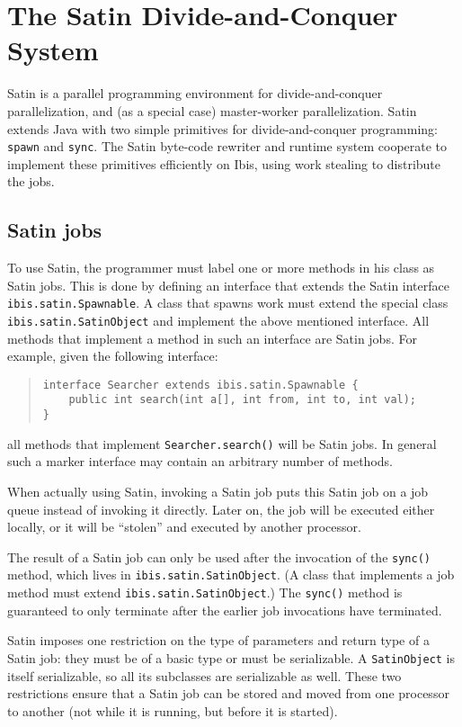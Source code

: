 \documentclass[10pt]{article}
\newcommand{\mysection}[1]{\section{#1}\label{#1}}
\newcommand{\mysubsection}[1]{\subsection{#1}\label{#1}}
\begin{document}
\mysection{The Satin Divide-and-Conquer System}

Satin is a parallel programming environment for divide-and-conquer
parallelization, and (as a special case) master-worker parallelization.
Satin extends Java with two simple primitives for
divide-and-conquer programming: \texttt{spawn} and \texttt{sync}.
The Satin byte-code rewriter and
runtime system cooperate to implement these primitives efficiently on
Ibis, using work stealing to distribute the jobs.

\mysubsection{Satin jobs}

To use Satin, the programmer must label one or more methods in his class
as Satin jobs. This is done by defining an interface that extends
the Satin interface \texttt{ibis.satin.Spawnable}.
A class that spawns work must extend the special class
\texttt{ibis.satin.SatinObject} and implement the above mentioned interface.
All methods that implement a method in such an
interface are Satin jobs. For example, given the following interface:

\begin{quote}
\begin{verbatim}
interface Searcher extends ibis.satin.Spawnable {
    public int search(int a[], int from, int to, int val);
}
\end{verbatim}
\end{quote}
\noindent
all methods that implement \texttt{Searcher.search()} will be Satin jobs.
In general such a marker interface may contain an arbitrary number
of methods.

When actually using Satin, invoking a Satin job puts this Satin job
on a job queue instead of invoking it directly.
Later on, the job will be executed either locally, or it will be
``stolen'' and executed by another processor.

The result of a Satin job can only be used after the invocation
of the \texttt{sync()} method, which lives in \texttt{ibis.satin.SatinObject}.
(A class that implements a job method must extend
\texttt{ibis.satin.SatinObject}.)
The \texttt{sync()}
method is guaranteed to only terminate after the earlier job
invocations have terminated.

Satin imposes one restriction on the type of parameters and return type
of a Satin job: they must be of a basic type or must be serializable.
A \texttt{SatinObject} is itself serializable, so all its subclasses
are serializable as well.
These two restrictions ensure that a Satin job can be stored and
moved from one processor to another (not while it is running, but before
it is started).
\end{document}
